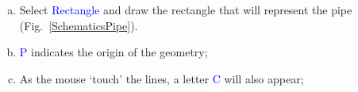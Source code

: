 \documentclass[10pt,compress]{beamer}
\newcommand{\blue}{\textcolor{blue}}
\begin{document}
\begin{frame}
\begin{columns}
\begin{column}[l]{0.5\linewidth}
\begin{enumerate}[1)]
\begin{enumerate}[a)]
                    \item<3-> Select \blue{Rectangle} and draw the rectangle that will represent the pipe (Fig.~\ref{SchematicsPipe}). 
                    \item<3-> \blue{P} indicates the origin of the geometry;
                    \item<3-> As the mouse `touch' the lines, a letter \blue{C} will also appear;
                 \end{enumerate}
          \end{enumerate} 
          \begin{center}
          \end{center}
       \end{column}
    \end{columns}

\end{frame} 
\end{document}
